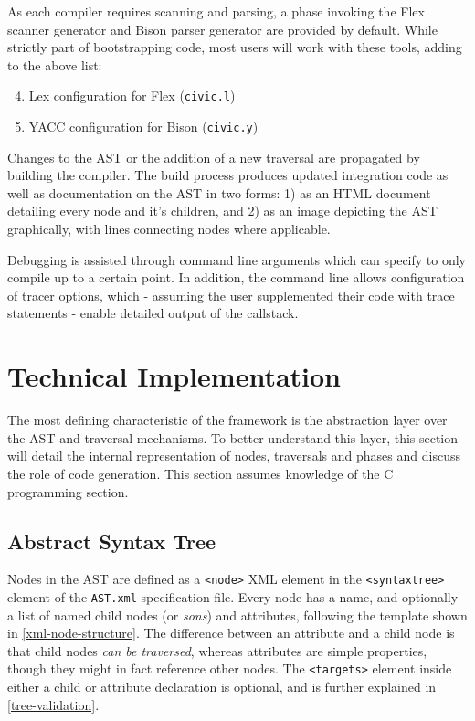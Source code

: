 \documentclass[twoside,openright]{uva-bachelor-thesis}
\newcommand{\includecode}[3]{\begin{figure}\end{figure}}
\newcommand{\includexml}[3]{\begin{figure}\end{figure}}
\newcommand{\code}[1]{\texttt{\footnotesize#1}}
\begin{document}
		As each compiler requires scanning and parsing, a phase invoking the Flex scanner generator and Bison parser generator are provided by default. While strictly part of bootstrapping code, most users will work with these tools, adding to the above list:
		\begin{enumerate}
			\setcounter{enumi}{3}
			\item Lex configuration for Flex (\code{civic.l})
			\item YACC configuration for Bison (\code{civic.y})
		\end{enumerate}
		
		Changes to the AST or the addition of a new traversal are propagated by building the compiler. The build process produces updated integration code as well as documentation on the AST in two forms: 1) as an HTML document detailing every node and it's children, and 2) as an image depicting the AST graphically, with lines connecting nodes where applicable.
		
		Debugging is assisted through command line arguments which can specify to only compile up to a certain point. In addition, the command line allows configuration of tracer options, which - assuming the user supplemented their code with trace statements - enable detailed output of the callstack.
	
		
	\section{Technical Implementation}
		The most defining characteristic of the framework is the abstraction layer over the AST and traversal mechanisms. To better understand this layer, this section will detail the internal representation of nodes, traversals and phases and discuss the role of code generation. This section assumes knowledge of the C programming section.
		
		\subsection{Abstract Syntax Tree}
			\includexml{node_structure.xml}{xml-node-structure}{Template for specification of a node}
			\includecode{c_node_structure.c}{c-node-structure}{Internal structure of a node}
			
			Nodes in the AST are defined as a \code{<node>} XML element in the \code{<syntaxtree>} element of the \code{AST.xml} specification file. Every node has a name, and optionally a list of named child nodes (or \emph{sons}) and attributes, following the template shown in \cref{xml-node-structure}. The difference between an attribute and a child node is that child nodes \emph{can be traversed}, whereas attributes are simple properties, though they might in fact reference other nodes. The \code{<targets>} element inside either a child or attribute declaration is optional, and is further explained in \cref{tree-validation}.
			
\end{document}
